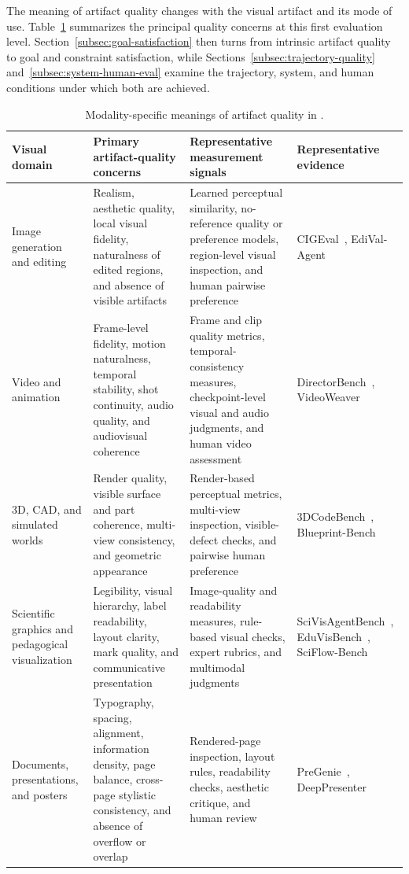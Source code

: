 The meaning of artifact quality changes with the visual artifact and its mode of use. Table~\ref{tab:artifact-quality-modalities} summarizes the principal quality concerns at this first evaluation level. Section~\ref{subsec:goal-satisfaction} then turns from intrinsic artifact quality to goal and constraint satisfaction, while Sections~\ref{subsec:trajectory-quality} and~\ref{subsec:system-human-eval} examine the trajectory, system, and human conditions under which both are achieved.

\begin{table}[t]
  \caption{Modality-specific meanings of artifact quality in \AVG{}.}
  \label{tab:artifact-quality-modalities}
  \small
  \begin{tabularx}{\textwidth}{@{}p{}XXX@{}}
    \toprule
    Visual domain & Primary artifact-quality concerns & Representative measurement signals & Representative evidence \\
    \midrule
    Image generation and editing & Realism, aesthetic quality, local visual fidelity, naturalness of edited regions, and absence of visible artifacts & Learned perceptual similarity, no-reference quality or preference models, region-level visual inspection, and human pairwise preference & CIGEval~\cite{avg250407046}, EdiVal-Agent~\cite{avg250913399} \\
    Video and animation & Frame-level fidelity, motion naturalness, temporal stability, shot continuity, audio quality, and audiovisual coherence & Frame and clip quality metrics, temporal-consistency measures, checkpoint-level visual and audio judgments, and human video assessment & DirectorBench~\cite{avg260530090}, VideoWeaver~\cite{avg260608091} \\
    3D, CAD, and simulated worlds & Render quality, visible surface and part coherence, multi-view consistency, and geometric appearance & Render-based perceptual metrics, multi-view inspection, visible-defect checks, and pairwise human preference & 3DCodeBench~\cite{avg260601057}, Blueprint-Bench~\cite{avg250925229} \\
    Scientific graphics and pedagogical visualization & Legibility, visual hierarchy, label readability, layout clarity, mark quality, and communicative presentation & Image-quality and readability measures, rule-based visual checks, expert rubrics, and multimodal judgments & SciVisAgentBench~\cite{avg260329139}, EduVisBench~\cite{avg250516832}, SciFlow-Bench~\cite{avg260209809} \\
    Documents, presentations, and posters & Typography, spacing, alignment, information density, page balance, cross-page stylistic consistency, and absence of overflow or overlap & Rendered-page inspection, layout rules, readability checks, aesthetic critique, and human review & PreGenie~\cite{xu2025pregenie}, DeepPresenter~\cite{zheng2026deeppresenter} \\

\end{tabularx}
\end{table}
